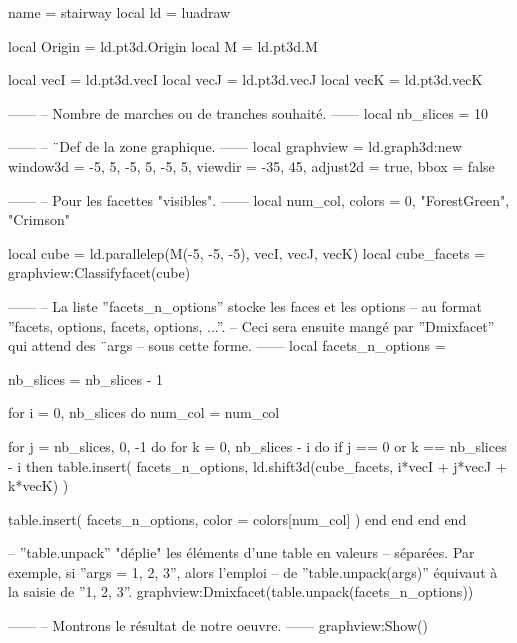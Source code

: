 \documentclass[border = 3pt]{standalone}
\begin{document}
\begin{luadraw*}{name = stairway}
local ld = luadraw

local Origin = ld.pt3d.Origin
local M      = ld.pt3d.M

local vecI = ld.pt3d.vecI
local vecJ = ld.pt3d.vecJ
local vecK = ld.pt3d.vecK

------
-- Nombre de marches ou de tranches souhaité.
------
local nb_slices = 10

------
-- ¨Def de la zone graphique.
------
local graphview = ld.graph3d:new{
  window3d = {-5, 5, -5, 5, -5, 5},
  viewdir  = {-35, 45},
  adjust2d = true,
  bbox     = false
}

------
-- Pour les facettes "visibles".
------
local num_col, colors = 0, {"ForestGreen", "Crimson"}

local cube        = ld.parallelep(M(-5, -5, -5), vecI, vecJ, vecK)
local cube_facets = graphview:Classifyfacet(cube)

------
-- La liste ''facets_n_options'' stocke les faces et les options
-- au format ''{facets, options, facets, options, ...}''.
-- Ceci sera ensuite mangé par ''Dmixfacet'' qui attend des ¨args
-- sous cette forme.
------
local facets_n_options = {}

nb_slices = nb_slices - 1

for i = 0, nb_slices do
  num_col = num_col%

  for j = nb_slices, 0, -1 do
    for k = 0, nb_slices - i do
      if j == 0 or k == nb_slices - i then
        table.insert(
          facets_n_options,
          ld.shift3d(cube_facets, i*vecI + j*vecJ + k*vecK)
        )

        table.insert(
          facets_n_options,
          {
            color = colors[num_col]
          }
        )
      end
    end
  end
end

-- ''table.unpack'' "déplie" les éléments d'une table en valeurs
-- séparées. Par exemple, si ''args = {1, 2, 3}'', alors l'emploi
-- de ''table.unpack(args)'' équivaut à la saisie de ''1, 2, 3''.
graphview:Dmixfacet(table.unpack(facets_n_options))

------
-- Montrons le résultat de notre oeuvre.
------
graphview:Show()
\end{luadraw*}
\end{document}

